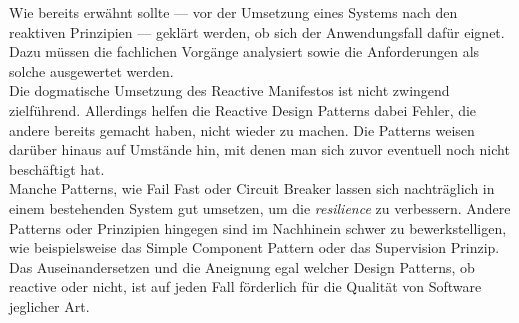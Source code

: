 Wie bereits erwähnt sollte --- vor der Umsetzung eines Systems nach den reaktiven Prinzipien --- geklärt werden, ob sich der Anwendungsfall dafür eignet. Dazu müssen die fachlichen Vorgänge analysiert sowie die Anforderungen als solche ausgewertet werden.\\
Die dogmatische Umsetzung des Reactive Manifestos ist nicht zwingend zielführend. Allerdings helfen die Reactive Design Patterns dabei Fehler, die andere bereits gemacht haben, nicht wieder zu machen. Die Patterns weisen darüber hinaus auf Umstände hin, mit denen man sich zuvor eventuell noch nicht beschäftigt hat.\\
Manche Patterns, wie Fail Fast oder Circuit Breaker lassen sich nachträglich in einem bestehenden System gut umsetzen, um die \textit{resilience} zu verbessern. Andere Patterns oder Prinzipien hingegen sind im Nachhinein schwer zu bewerkstelligen, wie beispielsweise das Simple Component Pattern oder das Supervision Prinzip.
Das Auseinandersetzen und die Aneignung egal welcher Design Patterns, ob reactive oder nicht, ist auf jeden Fall förderlich für die Qualität von Software jeglicher Art.